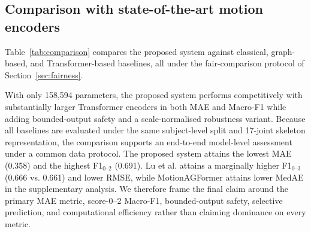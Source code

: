 \documentclass[preprint,12pt]{elsarticle}
\begin{document}
\subsection{Comparison with state-of-the-art motion encoders}
\label{sec:comparison}
Table~\ref{tab:comparison} compares the proposed system against classical,
graph-based, and Transformer-based baselines, all under the fair-comparison
protocol of Section~\ref{sec:fairness}.

\begin{table}[htpb]
\centering
\caption{Comparison on the combined CNUH+CARE-PD cohort (17-joint,
subject-level GroupKFold 5-fold, $N=6{,}087$). All models use the same
subject-level split and H36M-compatible skeleton representation with
model-specific input adapters.}
\label{tab:comparison}
\end{table}

With only 158{,}594 parameters, the proposed system performs competitively with
substantially larger Transformer encoders in both MAE and Macro-F1 while adding
bounded-output safety and a scale-normalised robustness variant. Because all
baselines are evaluated under the same subject-level split and 17-joint
skeleton representation, the comparison supports an end-to-end model-level
assessment under a common data protocol.
The proposed system attains the lowest MAE (0.358) and the highest
F1$_{0\text{--}2}$ (0.691). Lu et al. attains a marginally higher
F1$_{0\text{--}3}$ (0.666 vs. 0.661) and lower RMSE, while MotionAGFormer
attains lower MedAE in the supplementary analysis. We therefore frame the final
claim around the primary MAE metric, score-0--2 Macro-F1, bounded-output safety,
selective prediction, and computational efficiency rather than claiming
dominance on every metric.
\end{document}

